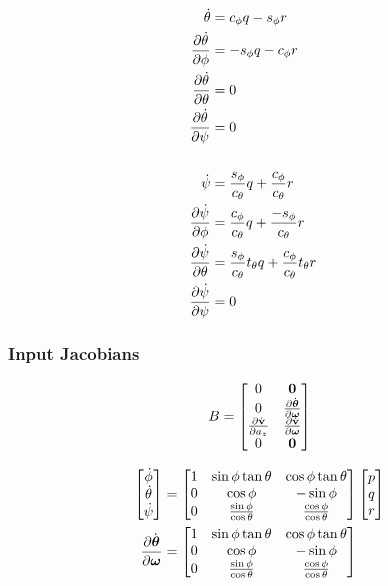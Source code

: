 \documentclass[a4paper]{article}
\begin{document}
\begin{align*}
  \\
  \dot{\theta} &= c_\phi q - s_\phi r \\
  \frac{\partial \dot{\theta}}{\partial \phi} &= -s_\phi q - c_\phi r \\
  \frac{\partial \dot{\theta}}{\partial \theta} &= 0 \\
  \frac{\partial \dot{\theta}}{\partial \psi} &= 0 \\
  \\
  \dot{\psi} &= \frac{s_\phi}{c_\theta} q + \frac{c_\phi}{c_\theta} r \\
  \frac{\partial \dot{\psi}}{\partial \phi} &= \frac{c_\phi}{c_\theta} q +
    \frac{-s_\phi}{c_\theta} r \\
  \frac{\partial \dot{\psi}}{\partial \theta} &= \frac{s_\phi}{c_\theta} t_\theta q +
  \frac{c_\phi}{c_\theta}t_\theta r \\
  \frac{\partial \dot{\psi}}{\partial \psi} &= 0 \\
\end{align*}
\TODO

\subsubsection{Input Jacobians}
\begin{equation}
  B =
  \begin{bmatrix}
    0 & \boldsymbol{\mathrm{0}} \\
    0 & \frac{\partial \dot{\boldsymbol{\mathrm{\theta}}}}{\partial \boldsymbol{\mathrm{\omega}}} \\
    \frac{\partial \dot{\boldsymbol{\mathrm{v}}}}{\partial a_z} & \frac{\partial
      \dot{\boldsymbol{\mathrm{v}}}}{\partial \boldsymbol{\mathrm{\omega}}} \\
    0 & \boldsymbol{\mathrm{0}} 
  \end{bmatrix}
\end{equation}

\begin{align*}
  \begin{bmatrix}
    \dot{\phi} \\
    \dot{\theta} \\
    \dot{\psi}
  \end{bmatrix}
  &=
  \begin{bmatrix}
    1 & \sin\phi\tan\theta & \cos\phi\tan\theta \\
    0 & \cos\phi & -\sin\phi \\
    0 & \frac{\sin\phi}{\cos\theta} & \frac{\cos\phi}{\cos\theta}
  \end{bmatrix}
  \begin{bmatrix}
    p \\
    q \\
    r 
  \end{bmatrix}
  \\
  \frac{\partial \dot{\boldsymbol{\mathrm{\theta}}}}{\partial \boldsymbol{\mathrm{\omega}}} &=
  \begin{bmatrix}
    1 & \sin\phi\tan\theta & \cos\phi\tan\theta \\
    0 & \cos\phi & -\sin\phi \\
    0 & \frac{\sin\phi}{\cos\theta} & \frac{\cos\phi}{\cos\theta}
  \end{bmatrix}
\end{align*}
\TODO



\end{document}

